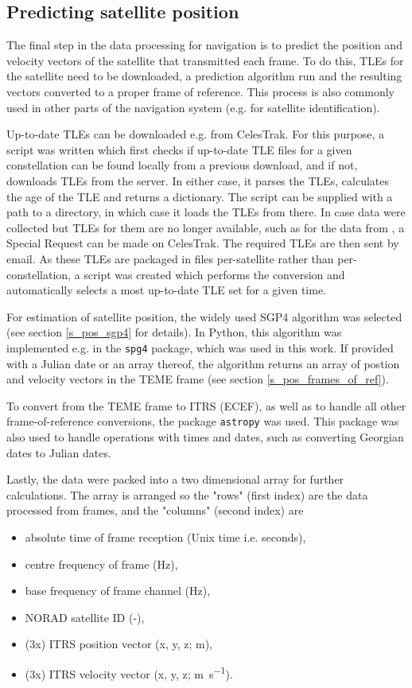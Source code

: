 \subsection{Predicting satellite position}
The final step in the data processing for navigation is to predict the position and velocity vectors of the satellite that transmitted each frame. To do this, TLEs for the satellite need to be downloaded, a prediction algorithm run and the resulting vectors converted to a proper frame of reference. This process is also commonly used in other parts of the navigation system (e.g. for satellite identification).

Up-to-date TLEs can be downloaded e.g. from CelesTrak\cite{des11}. For this purpose, a script was written which first checks if up-to-date TLE files for a given constellation can be found locally from a previous download, and if not, downloads TLEs from the server. In either case, it parses the TLEs, calculates the age of the TLE and returns a dictionary. The script can be supplied with a path to a directory, in which case it loads the TLEs from there. In case data were collected but TLEs for them are no longer available, such as for the data from \cite{sat08}, a Special Request can be made on CelesTrak. The required TLEs are then sent by email. As these TLEs are packaged in files per-satellite rather than per-constellation, a  script was created which performs the conversion and automatically selects a most up-to-date TLE set for a given time.

For estimation of satellite position, the widely used SGP4 algorithm was selected (see section \ref{s_pos_sgp4} for details). In Python, this algorithm was implemented e.g. in the \texttt{spg4} package\cite{des12}, which was used in this work. If provided with a Julian date or an array thereof, the algorithm returns an array of postion and velocity vectors in the TEME frame (see section \ref{s_pos_frames_of_ref}).

To convert from the TEME frame to ITRS (ECEF), as well as to handle all other frame-of-reference conversions, the package \texttt{astropy}\cite{des13} was used. This package was also used to handle operations with times and dates, such as converting Georgian dates to Julian dates.

Lastly, the data were packed into a two dimensional array for further calculations. The array is arranged so the "rows" (first index) are the data processed from frames, and the "columns" (second index) are

\begin{itemize}
    \item absolute time of frame reception (Unix time i.e. seconds),
    \item centre frequency of frame (Hz),
    \item base frequency of frame channel (Hz),
    \item NORAD satellite ID (-),
    \item (3x) ITRS position vector (x, y, z; m),
    \item (3x) ITRS velocity vector (x, y, z; \unit{\m\per\s}).
\end{itemize}



